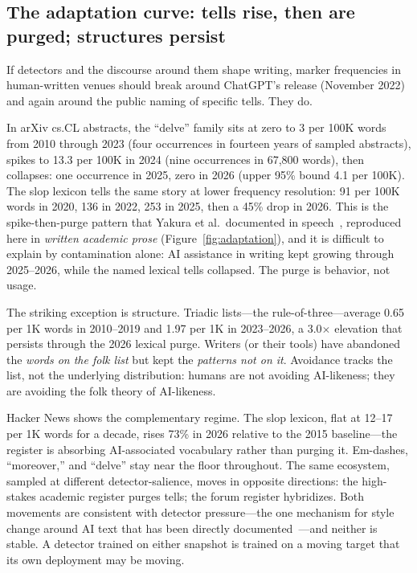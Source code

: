 \documentclass[sigconf,nonacm]{acmart}
\begin{document}
\subsection{The adaptation curve: tells rise, then are purged; structures persist}

If detectors and the discourse around them shape writing, marker frequencies in human-written venues should break around ChatGPT's release (November 2022) and again around the public naming of specific tells. They do.

In arXiv cs.CL abstracts, the ``delve'' family sits at zero to 3 per 100K words from 2010 through 2023 (four occurrences in fourteen years of sampled abstracts), spikes to 13.3 per 100K in 2024 (nine occurrences in 67{,}800 words), then collapses: one occurrence in 2025, zero in 2026 (upper 95\% bound 4.1 per 100K). The slop lexicon tells the same story at lower frequency resolution: 91 per 100K words in 2020, 136 in 2022, 253 in 2025, then a 45\% drop in 2026. This is the spike-then-purge pattern that Yakura et al.\ documented in speech~\cite{r2}, reproduced here in \emph{written academic prose} (Figure~\ref{fig:adaptation}), and it is difficult to explain by contamination alone: AI assistance in writing kept growing through 2025--2026, while the named lexical tells collapsed. The purge is behavior, not usage.

The striking exception is structure. Triadic lists---the rule-of-three---average 0.65 per 1K words in 2010--2019 and 1.97 per 1K in 2023--2026, a 3.0$\times$ elevation that persists through the 2026 lexical purge. Writers (or their tools) have abandoned the \emph{words on the folk list} but kept the \emph{patterns not on it}. Avoidance tracks the list, not the underlying distribution: humans are not avoiding AI-likeness; they are avoiding the folk theory of AI-likeness.

Hacker News shows the complementary regime. The slop lexicon, flat at 12--17 per 1K words for a decade, rises 73\% in 2026 relative to the 2015 baseline---the register is absorbing AI-associated vocabulary rather than purging it. Em-dashes, ``moreover,'' and ``delve'' stay near the floor throughout. The same ecosystem, sampled at different detector-salience, moves in opposite directions: the high-stakes academic register purges tells; the forum register hybridizes. Both movements are consistent with detector pressure---the one mechanism for style change around AI text that has been directly documented~\cite{r2}---and neither is stable. A detector trained on either snapshot is trained on a moving target that its own deployment may be moving.
\end{document}
